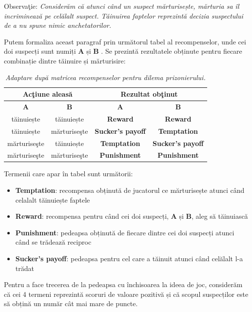 Observaţie: \textit{Considerăm că atunci când un suspect mărturisește, mărturia sa îl incriminează pe celălalt suspect. Tăinuirea faptelor reprezintă decizia suspectului de a nu spune nimic anchetatorilor.}

Putem formaliza aceast paragraf prin următorul tabel al recompenselor, unde cei doi suspecți sunt numiți \textbf{A} și \textbf{B} \cite{plato_stanford}. Se prezintă rezultatele obținute pentru fiecare combinație dintre tăinuire și mărturisire:  

\begin{table}[H]
	\centering
	\def\arraystretch{1.75}
	\begin{tabular}{|c|c|c|c|}
		\hline
		\multicolumn{2}{|c|}{\textbf{Acţiune aleasă}} & \multicolumn{2}{c|}{\textbf{Rezultat obţinut}} \\ \hline
		\textbf{A} & \textbf{B} & \textbf{A} & \textbf{B} \\ \hline
		tăinuiește & tăinuiește & \textbf{Reward} & \textbf{Reward} \\ \hline
		tăinuiește & mărturiseşte & \textbf{Sucker's payoff} & \textbf{Temptation} \\ \hline
		mărturiseşte & tăinuiește & \textbf{Temptation} & \textbf{Sucker's payoff} \\ \hline
		mărturiseşte & mărturiseşte & \textbf{Punishment} & \textbf{Punishment} \\ \hline
	\end{tabular}
	\caption{\textit{Adaptare după matricea recompenselor pentru dilema prizonierului.}}
	\label{matricea_recompenselor}
\end{table}

Termenii care apar în tabel sunt următorii: 
 
\begin{itemize} 
	\item \textbf{Temptation}: recompensa obținută de jucatorul ce mărturisește atunci când celalalt tăinuiește faptele 
	\item \textbf{Reward}: recompensa pentru când cei doi suspecți, \textbf{A} și \textbf{B}, aleg să tăinuiască 
	\item \textbf{Punishment}: pedeapsa obținută de fiecare dintre cei doi suspecți atunci când se trădează reciproc 
	\item \textbf{Sucker's payoff}: pedeapsa pentru cel care a tăinuit atunci când celălalt l-a trădat 
\end{itemize} 
 
Pentru a face trecerea de la pedeapsa cu închisoarea la ideea de joc, considerăm că cei 4 termeni reprezintă scoruri de valoare pozitivă și că scopul suspecților este să obțină un număr cât mai mare de puncte. 

